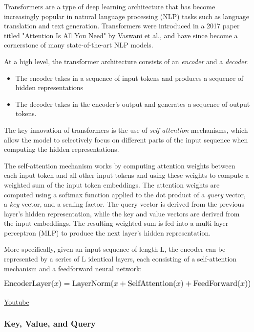 Transformers are a type of deep learning architecture that has become increasingly popular in natural language processing (NLP) tasks such as language translation and text generation. Transformers were introduced in a 2017 paper titled "Attention Is All You Need" by Vaswani et al., and have since become a cornerstone of many state-of-the-art NLP models. \newline

At a high level, the transformer architecture consists of an \textit{encoder} and a \textit{decoder}.

\begin{itemize}
    \item The encoder takes in a sequence of input tokens and produces a sequence of hidden representations
    \item The decoder takes in the encoder's output and generates a sequence of output tokens.
\end{itemize}
The key innovation of transformers is the use of \textit{self-attention} mechanisms, which allow the model to selectively focus on different parts of the input sequence when computing the hidden representations. \newline

The self-attention mechanism works by computing attention weights between each input token and all other input tokens and using these weights to compute a weighted sum of the input token embeddings. The attention weights are computed using a softmax function applied to the dot product of a \textit{query} vector, a \textit{key} vector, and a scaling factor. The query vector is derived from the previous layer's hidden representation, while the key and value vectors are derived from the input embeddings. The resulting weighted sum is fed into a multi-layer perceptron (MLP) to produce the next layer's hidden representation.\newline

More specifically, given an input sequence of length L, the encoder can be represented by a series of L identical layers, each consisting of a self-attention mechanism and a feedforward neural network:

\includegraphics[width=1\linewidth]{img//rnn//transformers/eq1.jpeg}

\href{https://www.youtube.com/watch?v=F-XN72bQiMQ&ab_channel=Udacity}{Youtube}
\subsubsection{Key, Value, and Query}

